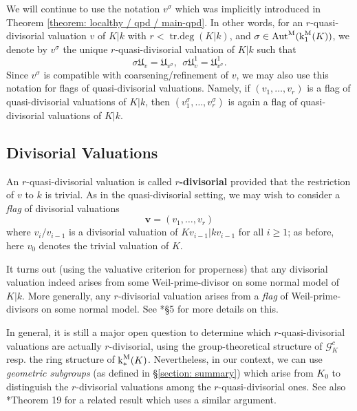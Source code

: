 \documentclass[11pt]{amsart}
\theoremstyle{definition}
\theoremstyle{remark}
\numberwithin{equation}{section}
\DeclareMathOperator{\Aut}{Aut}
\DeclareMathOperator{\trdeg}{tr.deg}
\newcommand{\Gc}{\mathcal{G}}
\newcommand{\vbf}{\mathbf{v}}
\newcommand{\Ufrak}{\mathfrak{U}}
\newcommand{\Autm}{\Aut^{\rm M}}
\renewcommand{\k}{\operatorname{k}^{\rm M}}
\begin{document}
We will continue to use the notation $v^\sigma$ which was implicitly introduced in Theorem \ref{theorem: localthy / qpd / main-qpd}.
In other words, for an $r$-quasi-divisorial valuation $v$ of $K|k$ with $r < \trdeg(K|k)$, and $\sigma \in \Autm(\k_1(K))$, we denote by $v^\sigma$ the unique $r$-quasi-divisorial valuation of $K|k$ such that
\[ \sigma \Ufrak_v  = \Ufrak_{v^\sigma}, \ \ \sigma\Ufrak_v^1 = \Ufrak_{v^\sigma}^1.\]
Since $v^\sigma$ is compatible with coarsening/refinement of $v$, we may also use this notation for flags of quasi-divisorial valuations.
Namely, if $(v_1,\ldots,v_r)$ is a flag of quasi-divisorial valuations of $K|k$, then $(v_1^\sigma,\ldots,v_r^\sigma)$ is again a flag of quasi-divisorial valuations of $K|k$.

\subsection{Divisorial Valuations}
\label{subsection: localthy / pd}

An $r$-quasi-divisorial valuation is called {\bf $r$-divisorial} provided that the restriction of $v$ to $k$ is trivial.
As in the quasi-divisorial setting, we may wish to consider a \emph{flag} of divisorial valuations
\[ \vbf = (v_1,\ldots,v_r) \]
where $v_i/v_{i-1}$ is a divisorial valuation of $Kv_{i-1}|kv_{i-1}$ for all $i \geq 1$; as before, here $v_0$ denotes the trivial valuation of $K$.

It turns out (using the valuative criterion for properness) that any divisorial valuation indeed arises from some Weil-prime-divisor on some normal model of $K|k$.
More generally, any $r$-divisorial valuation arises from a \emph{flag} of Weil-prime-divisors on some normal model.
See \cite{Pop:2006}*{\S5} for more details on this.

In general, it is still a major open question to determine which $r$-quasi-divisorial valuations are actually $r$-divisorial, using the group-theoretical structure of $\Gc_K^c$ resp. the ring structure of $\k_*(K)$.
Nevertheless, in our context, we can use \emph{geometric subgroups} (as defined in \S\ref{section: summary}) which arise from $K_0$ to distinguish the $r$-divisorial valuations among the $r$-quasi-divisorial ones.
See also \cite{Pop:2010a}*{Theorem 19} for a related result which uses a similar argument.
\end{document}
